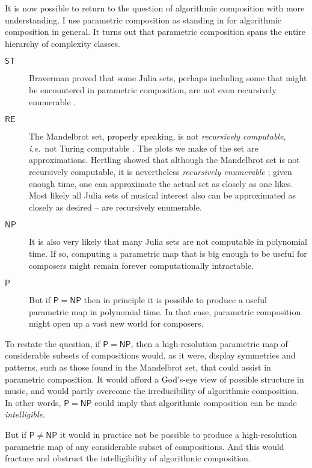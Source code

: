 \documentclass[11pt]{scrartcl}
\begin{document}
It is now possible to return to the question of algorithmic composition with more understanding. I use parametric composition as standing in for algorithmic composition in general. It turns out that parametric composition spans the entire hierarchy of complexity classes.

\begin{description}
\item[$\mathsf{ST}$]  Braverman proved that some Julia sets, perhaps including some that might be encountered in parametric composition, are not even recursively enumerable \parencite{braverman2006non, braverman2009computability}.
\item[$\mathsf{RE}$] The Mandelbrot set, properly speaking, is not \emph{recursively computable}, \emph{i.e.}\ not Turing computable \parencite{blum1993godel}. The plots we make of the set are approximations. Hertling showed that although the  Mandelbrot set is not recursively computable, it is nevertheless \emph{recursively enumerable} \parencite{Hertling2005-HERITM-3}; given enough time, one can approximate the actual set as closely as one likes. Most likely all Julia sets of musical interest also can be approximated as closely as desired -- are recursively enumerable.
\item[$\mathsf{NP}$] It is also very likely that many Julia sets are not computable in polynomial time. If so, computing a parametric map that is big enough to be useful for composers might remain forever computationally intractable.
\item[$\mathsf{P}$] But if $\mathsf{P} = \mathsf{NP}$ then in principle it is possible to produce a useful parametric map in polynomial time. In that case, parametric composition might open up a vast new world for composers.
\end{description}

To restate the question, if $\mathsf{P} = \mathsf{NP}$, then a high-resolution parametric map of considerable subsets of compositions would, as it were, display symmetries and patterns, such as those found in the Mandelbrot set, that could assist in parametric composition. It would afford a God's-eye view of possible structure in music, and would partly overcome the irreducibility of algorithmic composition. In other words, $\mathsf{P} = \mathsf{NP}$ could imply that algorithmic composition can be made \emph{intelligible}.

But if $\mathsf{P} \ne \mathsf{NP}$ it would in practice not be possible to produce a high-resolution parametric map of any considerable subset of compositions. And this would fracture and obstruct the intelligibility of algorithmic composition.
\end{document}
